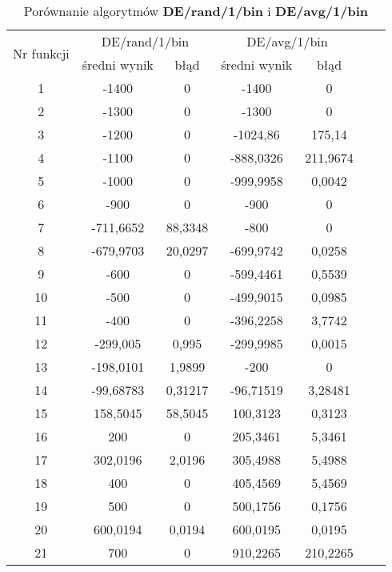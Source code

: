 \documentclass[a4paper,12pt]{article}
\theoremstyle{definition}
\begin{document}
\begin{table}[H]
\centering
\def\arraystretch{1.3}
\setlength\tabcolsep{10pt}
\caption{Porównanie algorytmów \textbf{DE/rand/1/bin} i \textbf{DE/avg/1/bin}}
\vspace{8pt}
\begin{tabular}{|c|c|c|c|c|c|c|}
	
	\hline
	\multirow{2}{*}{Nr funkcji} & \multicolumn{2}{c|}{DE/rand/1/bin} & \multicolumn{2}{c|}{DE/avg/1/bin}\\
	\cline{2-5}
	& średni wynik & błąd & średni wynik & błąd\\\hline
	1     & -1400 & 0     & -1400 & 0 \\\hline
    2     & -1300 & 0     & -1300 & 0 \\\hline
    3     & -1200 & 0     & -1024,86 & 175,14 \\\hline
    4     & -1100 & 0     & -888,0326 & 211,9674 \\\hline
    5     & -1000 & 0     & -999,9958 & 0,0042 \\\hline
    6     & -900  & 0     & -900  & 0 \\\hline
    7     & -711,6652 & 88,3348 & -800  & 0 \\\hline
    8     & -679,9703 & 20,0297 & -699,9742 & 0,0258 \\\hline
    9     & -600  & 0     & -599,4461 & 0,5539 \\\hline
    10    & -500  & 0     & -499,9015 & 0,0985 \\\hline
    11    & -400  & 0     & -396,2258 & 3,7742 \\\hline
    12    & -299,005 & 0,995 & -299,9985 & 0,0015 \\\hline
    13    & -198,0101 & 1,9899 & -200  & 0 \\\hline
    14    & -99,68783 & 0,31217 & -96,71519 & 3,28481 \\\hline
    15    & 158,5045 & 58,5045 & 100,3123 & 0,3123 \\\hline
    16    & 200   & 0     & 205,3461 & 5,3461 \\\hline
    17    & 302,0196 & 2,0196 & 305,4988 & 5,4988 \\\hline
    18    & 400   & 0     & 405,4569 & 5,4569 \\\hline
    19    & 500   & 0     & 500,1756 & 0,1756 \\\hline
    20    & 600,0194 & 0,0194 & 600,0195 & 0,0195 \\\hline
    21    & 700   & 0     & 910,2265 & 210,2265 \\\hline

\end{tabular}
\end{table}
\end{document}
